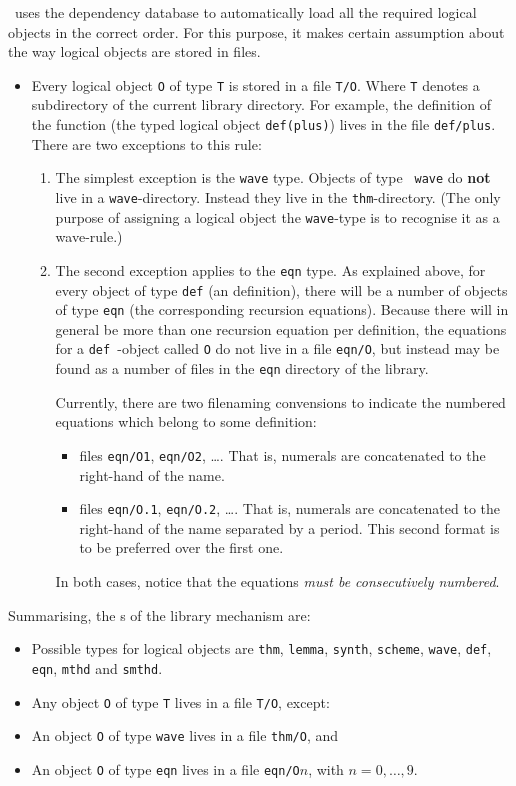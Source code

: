 \clam\ uses the  dependency database to automatically load
all the required logical objects in the correct order. For this purpose,
it makes certain assumption about the way logical objects are stored in
files.
\begin{itemize}
\item
Every logical object {\tt O} of type {\tt T} is stored in a file {\tt T/O}. 
Where {\tt T} denotes a subdirectory of the current library directory.
For example, the definition of the function  (the typed logical object 
{\tt def(plus)}) lives in the file {\tt def/plus}. There are two exceptions to 
this rule:
\begin{enumerate}
\item
The simplest exception is the {\tt wave} type. Objects of type {\tt
wave} do {\bf not} live in a {\tt wave}-directory. Instead they live
in the {\tt thm}-directory. (The only purpose of assigning a logical
object the {\tt wave}-type is to recognise it as a wave-rule.)
\item
The second exception applies to the {\tt eqn} type. As explained
above, for every object of type {\tt def} (an \oyster definition),
there will be a number of objects of type {\tt eqn} (the corresponding
recursion equations). Because there will in general be more than one
recursion equation per definition, the equations for a {\tt def
}-object called {\tt O} do not live in a file {\tt eqn/O}, but instead
may be found as a number of files in the {\tt eqn} directory of the
library.

Currently, there are two filenaming convensions to indicate the
numbered equations which belong to some definition:
\begin{itemize}
\item files {\tt eqn/O1}, {\tt eqn/O2}, \ldots.  That is, numerals are
concatenated to the right-hand of the name.  
\item files {\tt eqn/O.1}, {\tt eqn/O.2}, \ldots.  That is, numerals are
concatenated to the right-hand of the name separated by a period.
This second format is to be preferred over the first one.
\end{itemize}
In both cases, notice that the equations {\em must be consecutively
numbered}.

\end{enumerate}
\end{itemize}

Summarising, the s of the library mechanism
are: 
\begin{itemize}
\item
Possible types for logical objects are {\tt thm}, {\tt lemma},
{\tt synth}, {\tt scheme}, {\tt wave}, {\tt def}, {\tt eqn},
{\tt mthd} and {\tt smthd}.
\item
Any object {\tt O} of type {\tt T} lives in a file {\tt T/O}, except:
\item
An object {\tt O} of type {\tt wave} lives in a file {\tt thm/O}, and
\item
An object {\tt O} of type {\tt eqn} lives in a file {\tt eqn/O$n$}, with
$n=0,\ldots,9$.
\end{itemize}

